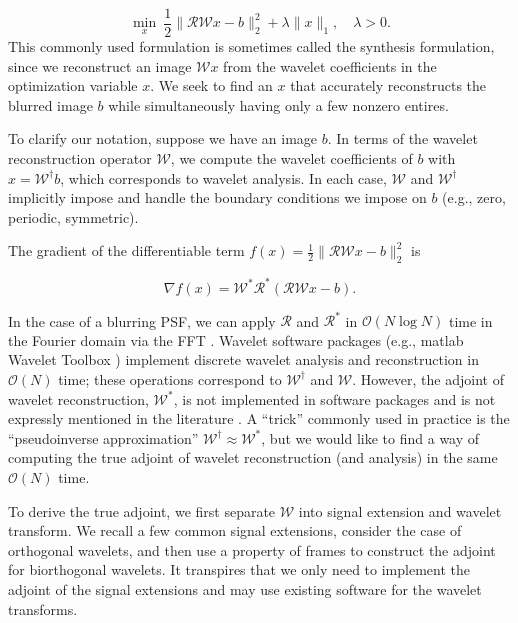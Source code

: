 \documentclass[journal]{IEEEtran}
\begin{document}
\begin{equation}
\label{eq:syn_problem}
\min_x~ \dfrac{1}{2}\|\mathcal{RW}x-b\|_2^2 + \lambda \|x\|_1, \quad \lambda>0.
\end{equation}
This commonly used formulation \cite{beck_2009} is sometimes called the synthesis formulation, since we reconstruct an image $\mathcal{W}x$ from the wavelet coefficients in the optimization variable $x$.  We seek to find an $x$ that accurately reconstructs the blurred image $b$ while simultaneously having only a few nonzero entires.

To clarify our notation, suppose we have an image $b$.  In terms of the wavelet reconstruction operator $\mathcal{W}$, we compute the wavelet coefficients of $b$ with $x=\mathcal{W}^\dagger b$, which corresponds to wavelet analysis.  In each case, $\mathcal{W}$ and $\mathcal{W}^\dagger$ implicitly impose and handle the boundary conditions we impose on $b$ (e.g., zero, periodic, symmetric).

The gradient of the differentiable term $f(x)={\frac{1}{2}\|\mathcal{RW}x-b\|_2^2}$ is

\[ \nabla f(x) = \mathcal{W}^\ast \mathcal{R}^\ast(\mathcal{RW}x-b). \] 

\noindent In the case of a blurring PSF, we can apply $\mathcal{R}$ and $\mathcal{R}^\ast$ in $\mathcal{O}(N\log N)$ time in the Fourier domain via the FFT \cite{beck_2009, hansen_2006}.  Wavelet software packages (e.g., {\sc matlab} Wavelet Toolbox \cite{matlab_wt_2015}) implement discrete wavelet analysis and reconstruction in $\mathcal{O}(N)$ time; these operations correspond to $\mathcal{W}^\dagger$ and $\mathcal{W}$.  However, the adjoint of wavelet reconstruction, $\mathcal{W}^\ast$, is not implemented in software packages and is not expressly mentioned in the literature \cite{mallat_2009, strang_1996}.  A ``trick'' commonly used in practice is the ``pseudoinverse approximation'' $\mathcal{W}^\dagger\approx\mathcal{W}^\ast$, but we would like to find a way of computing the true adjoint of wavelet reconstruction (and analysis) in the same $\mathcal{O}(N)$ time. 


To derive the true adjoint, we first separate $\mathcal{W}$ into signal extension and wavelet transform.  We recall a few common signal extensions, consider the case of orthogonal wavelets, and then use a property of frames to construct the adjoint for biorthogonal wavelets.  It transpires that we only need to implement the adjoint of the signal extensions and may use existing software for the wavelet transforms.
\end{document}
